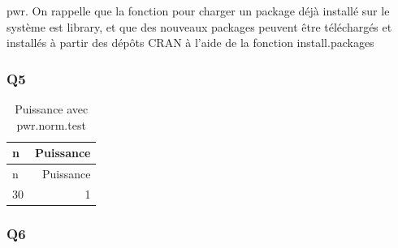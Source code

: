 \documentclass[
]{article}
\newenvironment{Shaded}{\begin{snugshade}}{\end{snugshade}}
\newcommand{\AttributeTok}[1]{\textcolor[rgb]{0.77,0.63,0.00}{#1}}
\newcommand{\CommentTok}[1]{\textcolor[rgb]{0.56,0.35,0.01}{\textit{#1}}}
\newcommand{\DecValTok}[1]{\textcolor[rgb]{0.00,0.00,0.81}{#1}}
\newcommand{\FloatTok}[1]{\textcolor[rgb]{0.00,0.00,0.81}{#1}}
\newcommand{\FunctionTok}[1]{\textcolor[rgb]{0.00,0.00,0.00}{#1}}
\newcommand{\NormalTok}[1]{#1}
\newcommand{\OtherTok}[1]{\textcolor[rgb]{0.56,0.35,0.01}{#1}}
\newcommand{\SpecialCharTok}[1]{\textcolor[rgb]{0.00,0.00,0.00}{#1}}
\newcommand{\StringTok}[1]{\textcolor[rgb]{0.31,0.60,0.02}{#1}}
\begin{document}
pwr. On rappelle que la fonction pour charger un package déjà installé
sur le système est library, et que des nouveaux packages peuvent être
téléchargés et installés à partir des dépôts CRAN à l'aide de la
fonction install.packages

\hypertarget{q5}{%
\subsubsection{Q5}\label{q5}}

\begin{Shaded}
\end{Shaded}

\begin{longtable}[]{@{}lr@{}}
\caption{Puissance avec pwr.norm.test}\tabularnewline
\toprule()
n & Puissance \\
\midrule()
\endfirsthead
\toprule()
n & Puissance \\
\midrule()
\endhead
30 & 1 \\
\bottomrule()
\end{longtable}

\hypertarget{q6}{%
\subsubsection{Q6}\label{q6}}
\end{document}
